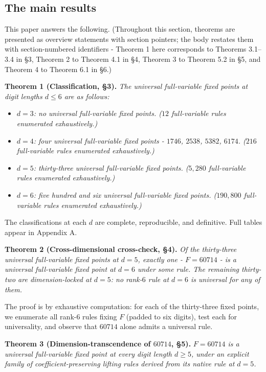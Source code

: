 \documentclass[11pt,letterpaper]{article}
\providecommand{\tightlist}{%
  \setlength{\itemsep}{0pt}\setlength{\parskip}{0pt}}
\theoremstyle{paperstyle}
\theoremstyle{paperstyledef}
\theoremstyle{paperstylerem}
\begin{document}
\hypertarget{the-main-results}{%
\subsection{The main results}\label{the-main-results}}

This paper answers the following. (Throughout this section, theorems are
presented as overview statements with section pointers; the body
restates them with section-numbered identifiers - Theorem 1 here
corresponds to Theorems 3.1--3.4 in §3, Theorem 2 to Theorem 4.1 in §4,
Theorem 3 to Theorem 5.2 in §5, and Theorem 4 to Theorem 6.1 in §6.)

\textbf{Theorem 1 (Classification, §3).} \emph{The universal
full-variable fixed points at digit lengths \(d \leq 6\) are as
follows:}

\begin{itemize}
\tightlist
\item
  \emph{\(d = 3\): no universal full-variable fixed points. (\(12\)
  full-variable rules enumerated exhaustively.)}
\item
  \emph{\(d = 4\): four universal full-variable fixed points -
  \(1746\), \(2538\), \(5382\), \(6174\). (\(216\) full-variable rules
  enumerated exhaustively.)}
\item
  \emph{\(d = 5\): thirty-three universal full-variable fixed points.
  (\(5{,}280\) full-variable rules enumerated exhaustively.)}
\item
  \emph{\(d = 6\): five hundred and six universal full-variable fixed
  points. (\(190{,}800\) full-variable rules enumerated exhaustively.)}
\end{itemize}

The classifications at each \(d\) are complete, reproducible, and
definitive. Full tables appear in Appendix A.

\textbf{Theorem 2 (Cross-dimensional cross-check, §4).} \emph{Of the
thirty-three universal full-variable fixed points at \(d = 5\), exactly
one - \(F = 60714\) - is a universal full-variable fixed point at
\(d = 6\) under some rule. The remaining thirty-two are dimension-locked
at \(d = 5\): no rank-\(6\) rule at \(d = 6\) is universal for any of
them.}

The proof is by exhaustive computation: for each of the thirty-three
fixed points, we enumerate all rank-\(6\) rules fixing \(F\) (padded to
six digits), test each for universality, and observe that \(60714\)
alone admits a universal rule.

\textbf{Theorem 3 (Dimension-transcendence of \(60714\), §5).}
\emph{\(F = 60714\) is a universal full-variable fixed point at every
digit length \(d \geq 5\), under an explicit family of
coefficient-preserving lifting rules derived from its native rule at
\(d = 5\).}
\end{document}
